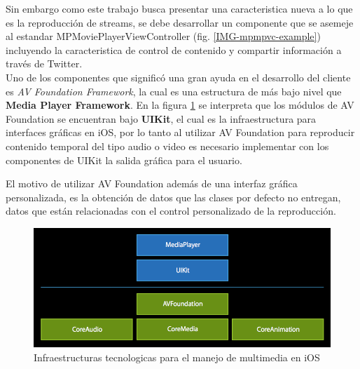 Sin embargo como este trabajo busca presentar una caracteristica nueva a lo que es la reproducción de streams, se debe desarrollar un componente que se asemeje al estandar MPMoviePlayerViewController (fig. \ref{IMG-mpmpvc-example}) incluyendo la caracteristica de control de contenido y compartir información a través de Twitter.\\

Uno de los componentes que significó una gran ayuda en el desarrollo del cliente es \textit{AV Foundation Framework}, la cual es una estructura de más bajo nivel que \textbf{Media Player Framework}. 
En la figura \ref{IMG-ios-tech-frameworks} se interpreta que los módulos de AV Foundation se encuentran bajo \textbf{UIKit}, el cual es la infraestructura para interfaces gráficas en iOS, por lo tanto al utilizar AV Foundation para reproducir contenido temporal del tipo audio o video es necesario implementar con los componentes de UIKit la salida gráfica para el usuario.

El motivo de utilizar AV Foundation además de una interfaz gráfica personalizada, es la obtención de datos que las clases por defecto no entregan, datos que están relacionadas con el control personalizado de la reproducción.


\begin{figure}[H]
	\centering
	\includegraphics[scale=0.5]{imgs/ios-tech-frameworks.png}
	\caption{Infraestructuras tecnologicas para el manejo de multimedia en iOS}
	\label{IMG-ios-tech-frameworks}	
\end{figure}

